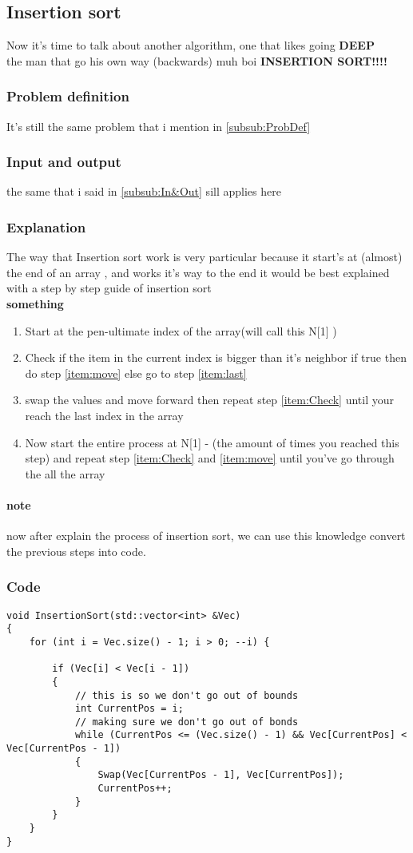 \documentclass{article}
\begin{document}
\subsection{Insertion sort}
Now it's time to talk about another algorithm, one that likes going \textbf{DEEP}\\
the man that go his own way (backwards) muh boi \textbf{INSERTION SORT!!!!}
\subsubsection{Problem definition}
It's still the same problem that i mention in \ref{subsub:ProbDef}
\subsubsection{Input and output}
the same that i said in \ref{subsub:In&Out} sill applies here 
\subsubsection{Explanation}
The way that Insertion sort work is very particular because it start's at (almost) the end of an array , and works it's way to the end it would be best explained with a step by step guide of insertion sort \\
\textbf{something}
\begin{enumerate}
\item \label{item:start} Start at the pen-ultimate index of the array(will call this N[1] )
\item \label{item:Check} Check if the item in the current index is bigger than it's neighbor if true then do step \ref{item:move} else go to step \ref{item:last}
\item \label{item:move} swap the values and move forward then repeat step \ref{item:Check} until your reach the last index in the array 
\item  \label{item:last}Now start the entire process at N[1] - (the amount of times you reached this step) and repeat step \ref{item:Check} and \ref{item:move} until you've go through the all the array 
\end{enumerate}
\paragraph{note} now after explain the process of insertion sort, we can use this knowledge convert the previous steps into code.\\
\subsubsection{Code} 
\begin{lstlisting} 
void InsertionSort(std::vector<int> &Vec)
{
	for (int i = Vec.size() - 1; i > 0; --i) {

		if (Vec[i] < Vec[i - 1])
		{
			// this is so we don't go out of bounds 
			int CurrentPos = i;
			// making sure we don't go out of bonds
			while (CurrentPos <= (Vec.size() - 1) && Vec[CurrentPos] < Vec[CurrentPos - 1])
			{
				Swap(Vec[CurrentPos - 1], Vec[CurrentPos]);
				CurrentPos++;
			}
		}
	}
}
\end{lstlisting}
\end{document}
